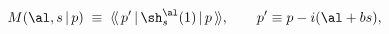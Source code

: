 \begin{equation}
M(\al,s\,|\,p)\;\equiv\;
\langle\!\langle \, p'\,|\,\sh_s^{\al}(1)\,
|\,p\, \rangle\!\rangle ,\qquad p'\equiv p-i(\al+bs),
\end{equation}


